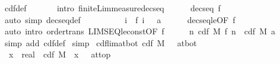 \documentclass{article}
\theoremstyle{definition}
\begin{document}
\begin{isabellebody}
\ cdf{\isacharunderscore}def\ \isanewline
\ \ \ \ \isamarkupfalse%
\ {\isacharparenleft}intro\ finite{\isacharunderscore}Lim{\isacharunderscore}measure{\isacharunderscore}decseq{\isacharparenright}\isanewline
\ \ \ \ \isamarkupfalse%
\ {\isacharbackquoteopen}decseq\ f{\isacharbackquoteclose}\ \isamarkupfalse%
\ {\isacharparenleft}auto\ simp{\isacharcolon}\ decseq{\isacharunderscore}def{\isacharparenright}\isanewline
\ \ \ \ \isamarkupfalse%
\isanewline
\ \ \isamarkupfalse%
\ \isamarkupfalse%
\ {\isachardoublequoteopen}{\isacharparenleft}{\isasymInter}i{\isachardot}\ {\isacharbraceleft}{\isachardot}{\isachardot}\ f\ i{\isacharbraceright}{\isacharparenright}\ {\isacharequal}\ {\isacharbraceleft}{\isachardot}{\isachardot}\ a{\isacharbraceright}{\isachardoublequoteclose}\isanewline
\ \ \ \ \isamarkupfalse%
\ decseq{\isacharunderscore}le{\isacharbrackleft}OF\ f{\isacharbrackright}\ \isamarkupfalse%
\ {\isacharparenleft}auto\ intro{\isacharcolon}\ order{\isacharunderscore}trans\ LIMSEQ{\isacharunderscore}le{\isacharunderscore}const{\isacharbrackleft}OF\ f{\isacharparenleft}{}{\isacharparenright}{\isacharbrackright}{\isacharparenright}\isanewline
\ \ \isamarkupfalse%
\ \isamarkupfalse%
\ {\isachardoublequoteopen}{\isacharparenleft}{\isasymlambda}n{\isachardot}\ cdf\ M\ {\isacharparenleft}f\ n{\isacharparenright}{\isacharparenright}\ {\isacharminus}{\isacharminus}{\isacharminus}{\isacharminus}{\isachargreater}\ cdf\ M\ a{\isachardoublequoteclose}\isanewline
\ \ \ \ \isamarkupfalse%
\ {\isacharparenleft}simp\ add{\isacharcolon}\ cdf{\isacharunderscore}def{\isacharparenright}\isanewline
{}\isamarkupfalse%
\ simp%
\isanewline\isanewline%
\isamarkupfalse%
\ cdf{\isacharunderscore}lim{\isacharunderscore}at{\isacharunderscore}bot{\isacharcolon}\ {\isachardoublequoteopen}{\isacharparenleft}cdf\ M\ {\isacharminus}{\isacharminus}{\isacharminus}{\isachargreater}\ {}{\isacharparenright}\ at{\isacharunderscore}bot{\isachardoublequoteclose}\isanewline
{}\isamarkupfalse%
\ {\isacharminus}\ \isanewline
\ \ \isamarkupfalse%
\ {}{\isacharcolon}\ {\isachardoublequoteopen}{\isacharparenleft}{\isacharparenleft}{\isacharpercent}x\ {\isacharcolon}{\isacharcolon}\ real{\isachardot}\ {\isacharminus}\ cdf\ M\ {\isacharparenleft}{\isacharminus}\ x{\isacharparenright}{\isacharparenright}\ {\isacharminus}{\isacharminus}{\isacharminus}{\isachargreater}\ {}{\isacharparenright}\ at{\isacharunderscore}top{\isachardoublequoteclose}\isanewline

\end{isabellebody}
\end{document}
